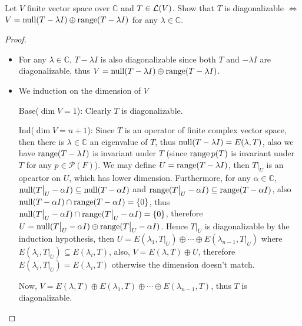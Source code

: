 \documentclass[../main.tex]{subfiles}
\begin{document}
\setcounter{exercise}{4}
\begin{exercise}
  Let $V$ finite vector space over $\mathbb{C}$ and $T \in \mathcal{L}(V)$.
  Show that $T$ is diagonalizable $\iff$ $V = \operatorname{null} (T - \lambda I) \oplus \operatorname{range} (T - \lambda I)$
  for any $\lambda \in \mathbb{C}$.
\end{exercise}
\begin{proof}
  ~
  \begin{itemize}
    \item For any $\lambda \in \mathbb{C}$, $T - \lambda I$ is also diagonalizable since both $T$ and $- \lambda I$ are diagonalizable,
          thus $V = \operatorname{null} (T - \lambda I) \oplus \operatorname{range} (T - \lambda I)$.
    \item We induction on the dimension of $V$

          Base($\dim V = 1$): Clearly $T$ is diagonalizable.

          Ind($\dim V = n + 1$): Since $T$ is an operator of finite complex vector space, then there is $\lambda \in \mathbb{C}$
          an eigenvalue of $T$, thus $\operatorname{null} (T - \lambda I) = E(\lambda, T)$,
          also we have $\operatorname{range} (T - \lambda I)$ is invariant under $T$ 
          (since $\operatorname{range} p(T)$ is invariant under $T$ for any $p \in \mathcal{P}(F)$).
          We may define $U = \operatorname{range} (T - \lambda I)$, then $T\big|_U$ is an opeartor
          on $U$, which has lower dimension.
          Furthermore, for any $\alpha \in \mathbb{C}$, $\operatorname{null} (T\big|_U - \alpha I) \subseteq \operatorname{null} (T - \alpha I)$
          and $\operatorname{range} (T\big|_U - \alpha I) \subseteq \operatorname{range} (T - \alpha I)$,
          also $\operatorname{null} (T - \alpha I) \cap \operatorname{range} (T - \alpha I) = \{0\}$,
          thus $\operatorname{null} (T\big|_U - \alpha I) \cap \operatorname{range} (T\big|_U - \alpha I) = \{0\}$,
          therefore $U = \operatorname{null} (T\big|_U - \alpha I) \oplus \operatorname{range} (T\big|_U - \alpha I)$.
          Hence $T\big|_U$ is diagonalizable by the induction hypothesis,
          then $U = E(\lambda_1, T\big|_U) \oplus \cdots \oplus E(\lambda_{n - 1}, T\big|_U)$
          where $E(\lambda_i, T\big|_U) \subseteq E(\lambda_i, T)$,
          also, $V = E(\lambda, T) \oplus U$, therefore $E(\lambda_i, T\big|_U) = E(\lambda_i, T)$
          otherwise the dimension doesn't match.

          Now, $V = E(\lambda, T) \oplus E(\lambda_1, T) \oplus \cdots \oplus E(\lambda_{n - 1}, T)$,
          thus $T$ is diagonalizable.
  \end{itemize}
\end{proof}
\end{document}
